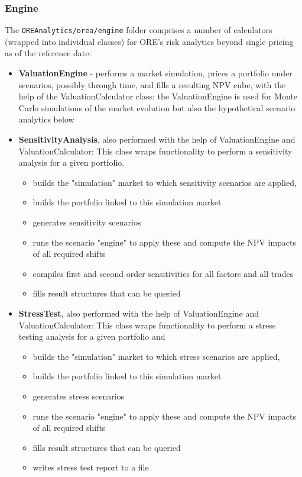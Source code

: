 \documentclass[12pt, a4paper]{report}
\begin{document}
\subsubsection{Engine}
The {\tt OREAnalytics/orea/engine} folder comprises a number of calculators (wrapped into individual classes) for ORE's risk analytics beyond single pricing as of the reference date:
\begin{itemize}
\item {\bf ValuationEngine} - performs a market simulation, prices a portfolio under scenarios, possibly through time, and fills a resulting NPV cube, with the help of the ValuationCalculator class; the ValuationEngine is used for Monte Carlo simulations of the market evolution but also the hypothetical scenario analytics below
\item {\bf SensitivityAnalysis}, also performed with the help of ValuationEngine and ValuationCalculator: This class wraps functionality to perform a sensitivity analysis for a given portfolio.
\begin{itemize}
\item builds the "simulation" market to which sensitivity scenarios are applied, 
\item builds the portfolio linked to this simulation market
\item generates sensitivity scenarios
\item runs the scenario "engine" to apply these and compute the NPV impacts of all required shifts
\item compiles first and second order sensitivities for all factors and all trades
\item fills result structures that can be queried
\end{itemize}
\item {\bf StressTest}, also performed with the help of ValuationEngine and ValuationCalculator: This class wraps functionality to perform a stress testing analysis for a given portfolio and
\begin{itemize}
\item builds the "simulation" market to which stress scenarios are applied, 
\item builds the portfolio linked to this simulation market
\item generates stress scenarios
\item runs the scenario "engine" to apply these and compute the NPV impacts of all required shifts
\item fills result structures that can be queried
\item writes stress test report to a file

\end{itemize}
\end{itemize}
\end{document}
